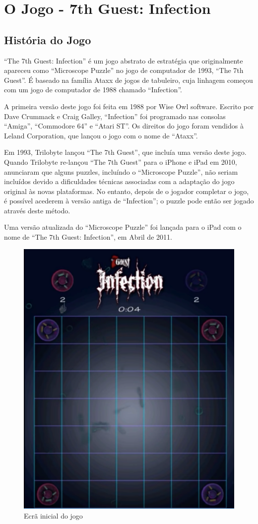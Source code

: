\documentclass[a4paper]{article}
\begin{document}
\newpage\section{O Jogo - 7th Guest: Infection}
\bigskip
\subsection{História do Jogo}

\bigskip
“The 7th Guest: Infection” é um jogo abstrato de estratégia que originalmente apareceu como “Microscope Puzzle” no jogo de computador de 1993, “The 7th Guest”. É baseado na família Ataxx de jogos de tabuleiro, cuja linhagem começou com um jogo de computador  de 1988 chamado “Infection”. 

\bigskip
A primeira versão deste jogo foi feita em 1988 por Wise Owl software. Escrito por Dave Crummack e Craig Galley, “Infection” foi programado nas consolas “Amiga”, “Commodore 64” e “Atari ST”. Os direitos do jogo foram vendidos à Leland Corporation, que lançou o jogo com o nome de “Ataxx”.

\bigskip
Em 1993, Trilobyte lançou “The 7th Guest”, que incluía uma versão deste jogo. Quando Trilobyte re-lançou “The 7th Guest” para o iPhone e iPad em 2010, anunciaram que alguns puzzles, incluíndo o “Microscope Puzzle”, não seriam incluídos devido a dificuldades técnicas associadas com a adaptação do jogo original às novas plataformas. No entanto, depois de o jogador completar o jogo, é possível acederem à versão antiga de “Infection”; o puzzle pode então ser jogado através deste método.

\bigskip
Uma versão atualizada do “Microscope Puzzle” foi lançada para o iPad com o nome de “The 7th Guest: Infection”, em Abril de 2011.

\bigskip
\begin{figure}[hbp!]
    \centering
    \includegraphics[width=.55\linewidth]{others/game-1.png}
    \caption{Ecrã inicial do jogo}
    \label{fig}
\end{figure}
\end{document}
